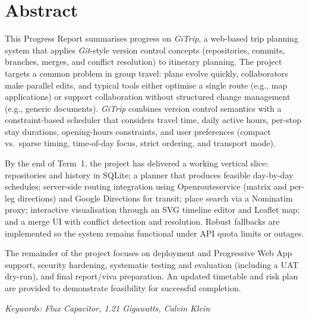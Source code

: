 
\section*{Abstract}
\vspace{2cm}

\large
This Progress Report summarises progress on \textit{GiTrip}, a web-based trip planning system that applies \textit{Git}-style version control concepts (repositories, commits, branches, merges, and conflict resolution) to itinerary planning. The project targets a common problem in group travel: plans evolve quickly, collaborators make parallel edits, and typical tools either optimise a single route (e.g., map applications) or support collaboration without structured change management (e.g., generic documents). \textit{GiTrip} combines version control semantics with a constraint-based scheduler that considers travel time, daily active hours, per-stop stay durations, opening-hours constraints, and user preferences (compact vs.\ sparse timing, time-of-day focus, strict ordering, and transport mode).

By the end of Term~1, the project has delivered a working vertical slice: repositories and history in SQLite; a planner that produces feasible day-by-day schedules; server-side routing integration using Openrouteservice (matrix and per-leg directions) and Google Directions for transit; place search via a Nominatim proxy; interactive visualisation through an SVG timeline editor and Leaflet map; and a merge UI with conflict detection and resolution. Robust fallbacks are implemented so the system remains functional under API quota limits or outages.

The remainder of the project focuses on deployment and Progressive Web App support, security hardening, systematic testing and evaluation (including a UAT dry-run), and final report/viva preparation. An updated timetable and risk plan are provided to demonstrate feasibility for successful completion.

\vspace{1cm}

\noindent \textit{Keywords: Flux Capacitor, 1.21 Gigawatts, Calvin Klein}